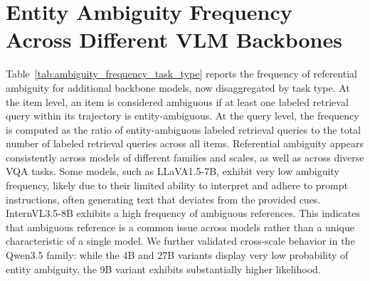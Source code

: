 \documentclass{article} %
\begin{document}
\section{Entity Ambiguity Frequency Across Different VLM Backbones}
Table~\ref{tab:ambiguity_frequency_task_type} reports the frequency of referential ambiguity for additional backbone models, now disaggregated by task type. At the item level, an item is considered ambiguous if at least one labeled retrieval query within its trajectory is entity-ambiguous. At the query level, the frequency is computed as the ratio of entity-ambiguous labeled retrieval queries to the total number of labeled retrieval queries across all items. Referential ambiguity appears consistently across models of different families and scales, as well as across diverse VQA tasks. Some models, such as LLaVA1.5-7B, exhibit very low ambiguity frequency, likely due to their limited ability to interpret and adhere to prompt instructions, often generating text that deviates from the provided cues. InternVL3.5-8B exhibits a high frequency of ambiguous references. This indicates that ambiguous reference is a common issue across models rather than a unique characteristic of a single model. We further validated cross-scale behavior in the Qwen3.5 family: while the 4B and 27B variants display very low probability of entity ambiguity, the 9B variant exhibits substantially higher likelihood.
\end{document}
